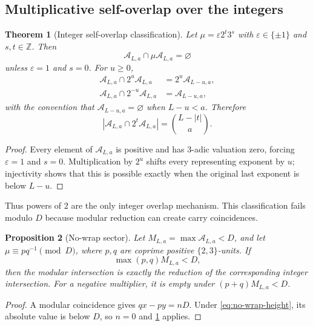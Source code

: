 \documentclass[11pt]{amsart}
\numberwithin{equation}{section}
\newtheorem{theorem}{Theorem}[section]
\newtheorem{proposition}[theorem]{Proposition}
\newcommand{\A}{\mathcal A}
\newcommand{\eps}{\varepsilon}
\begin{document}
\subsection{Multiplicative self-overlap over the integers}

\begin{theorem}[Integer self-overlap classification]\label{thm:integer-self-overlap}
Let $\mu=\eps2^t3^s$ with $\eps\in\{\pm1\}$ and $s,t\in\mathbb Z$.  Then
\[
\A_{L,a}\cap\mu\A_{L,a}=\varnothing
\]
unless $\eps=1$ and $s=0$.  For $u\ge0$,
\begin{align}
\A_{L,a}\cap2^u\A_{L,a}&=2^u\A_{L-u,a},\label{eq:positive-shift-overlap}\\
\A_{L,a}\cap2^{-u}\A_{L,a}&=\A_{L-u,a},\label{eq:negative-shift-overlap}
\end{align}
with the convention that $\A_{L-u,a}=\varnothing$ when $L-u<a$.  Therefore
\begin{equation}\label{eq:overlap-card}
\left|\A_{L,a}\cap2^t\A_{L,a}\right|
=\binom{L-|t|}{a}.
\end{equation}
\end{theorem}

\begin{proof}
Every element of $\A_{L,a}$ is positive and has $3$-adic valuation zero, forcing $\eps=1$ and $s=0$.  Multiplication by $2^u$ shifts every representing exponent by $u$; injectivity shows that this is possible exactly when the original last exponent is below $L-u$.
\end{proof}

Thus powers of $2$ are the only integer overlap mechanism.  This classification fails modulo $D$ because modular reduction can create carry coincidences.

\begin{proposition}[No-wrap sector]\label{prop:no-wrap}
Let $M_{L,a}=\max\A_{L,a}<D$, and let $\mu\equiv pq^{-1}\pmod D$, where $p,q$ are coprime positive $\{2,3\}$-units.  If
\begin{equation}\label{eq:no-wrap-height}
\max(p,q)M_{L,a}<D,
\end{equation}
then the modular intersection is exactly the reduction of the corresponding integer intersection.  For a negative multiplier, it is empty under $(p+q)M_{L,a}<D$.
\end{proposition}

\begin{proof}
A modular coincidence gives $qx-py=nD$.  Under \eqref{eq:no-wrap-height}, its absolute value is below $D$, so $n=0$ and \cref{thm:integer-self-overlap} applies.
\end{proof}
\end{document}
